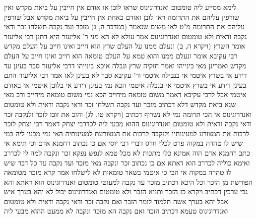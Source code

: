 \documentclass[12pt, openany]{book}
\begin{document}
{לימא מסייע ליה טומטום ואנדרוגינוס שראו לובן או אודם אין חייבין על ביאת מקדש ואין שורפין עליהם את התרומה ראו לובן ואודם כאחת אין חייבין על ביאת מקדש אבל שורפין עליהם את התרומה 
מ"ט לאו משום שנאמר (במדבר ה, ג) מזכר ועד נקבה תשלחו זכר ודאי נקבה ודאית ולא טומטום ואנדרוגינוס אמר עולא לא הא מני ר' אליעזר היא 
דתנן רבי אליעזר אומר השרץ (ויקרא ה, ב) ונעלם ממנו על העלם שרץ הוא חייב ואינו חייב על העלם מקדש 
רבי עקיבא אומר ונעלם ממנו והוא טמא על העלם טומאה הוא חייב ואינו חייב על העלם מקדש 
ואמרינן מאי בינייהו ואמר חזקיה שרץ ונבלה איכא בינייהו דרבי אליעזר סבר בעינן עד דידע אי בשרץ איטמי אי בנבילה איטמי ור' עקיבא סבר לא בעינן 
לאו אמר רבי אליעזר התם בעינן דידע אי בשרץ איטמי אי בנבלה איטמי הכא נמי בעינן דידע אי בלובן איטמי אי באודם איטמי 
אבל לרבי עקיבא דאמר משום טומאה מיחייב הכא נמי משום טומאה מיחייב 
ורב מאי שנא ביאת מקדש דלא דכתיב מזכר ועד נקבה תשלחו זכר ודאי נקבה ודאית ולא טומטום ואנדרוגינוס 
אי הכי תרומה נמי לא נשרוף דכתיב (ויקרא טו, לג) והזב את זובו לזכר ולנקבה זכר ודאי נקבה ודאית ולא טומטום ואנדרוגינוס 
ההוא מבעי ליה לכדרבי יצחק דאמר רבי יצחק לזכר לרבות את המצורע למעינותיו ולנקבה לרבות את המצורעת למעינותיה 
האי נמי מבעי ליה במי שיש לו טהרה במקוה פרט לכלי חרס דברי רבי יוסי 
אם כן נכתוב רחמנא אדם
וכי תימא אי כתב רחמנא אדם הוה אמינא כלי מתכות לא מכל טמא לנפש נפקא זכר ונקבה למה לי לכדרב 
ואימא כוליה לכדרב הוא דאתא אם כן נכתוב זכר ונקבה מאי מזכר ועד נקבה עד כל דבר שיש לו טהרה במקוה 
אי הכי כי איטמי בשאר טומאות לא לישלחו אמר קרא מזכר מטומאה הפורשת מן הזכר 
וכל היכא דכתיב מזכר עד נקבה למעוטי טומטום ואנדרוגינוס הוא דאתא והא גבי ערכין דכתיב {ויקרא כז } הזכר
ותניא הזכר ולא טומטום ואנדרוגינוס יכול לא יהא בערך איש אבל יהא בערך אשה תלמוד לומר הזכר ואם נקבה זכר ודאי נקבה ודאית ולא טומטום ואנדרוגינוס 
טעמא דכתיב הזכר ואם נקבה הא מזכר ונקבה לא ממעט ההוא מבעי ליה}
\end{document}
